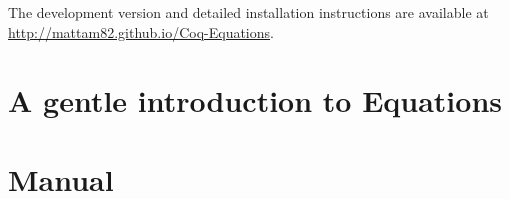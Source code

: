\documentclass{report}
\begin{document}
The development version and detailed installation instructions are available at
\url{http://mattam82.github.io/Coq-Equations}.

\doparttoc
\parttoc
\tableofcontents

\chapter{A gentle introduction to Equations}
\label{cha:gentle-intro}


\chapter{Manual}
\label{cha:manual}




\label{cha:bibliography}

\end{document}
